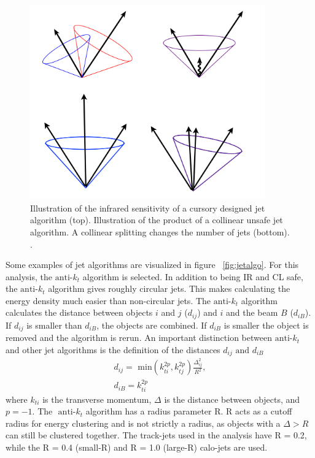 \begin{figure}[h]
\begin{center}
\includegraphics*[width=0.90\textwidth] {figures/IR_CL_safe}
\caption[Illustration of Infrared and collinear safety]{Illustration of the infrared sensitivity of a cursory designed jet algorithm (top). Illustration of the product of a collinear unsafe jet algorithm. A collinear splitting changes the number of jets (bottom). \cite{Isildak:2013kfa}.}
\label{fig:IR_CL}
\end{center}
\end{figure}

\indent Some examples of jet algorithms are visualized in figure ~\ref{fig:jetalgo}. For this analysis, the ${\text{anti-}k_{t}}$ algorithm is selected. In addition to being IR and CL safe, the ${\text{anti-}k_{t}}$ algorithm gives roughly circular jets. This makes calculating the energy density much easier than non-circular jets. The ${\text{anti-}k_{t}}$ algorithm calculates the distance between objects $i$ and $j$ ($d_{ij}$) and $i$ and the beam $B$ ($d_{iB}$). If ${d_{ij}}$ is smaller than ${d_{iB}}$, the objects are combined. If ${d_{iB}}$ is smaller the object is removed and the algorithm is rerun. An important distinction between ${\textrm{anti-}k_{t}}$ and other jet algorithms is the definition of the distances ${d_{ij}\text{ and } d_{iB}}$
\begin{equation}
\begin{split}
d_{ij} = \text{ min}(k^{2p}_{ti},k^{2p}_{tj})\frac{\Delta^{2}_{ij}}{R^{2}},\\
d_{iB} = k^{2p}_{ti}
\end{split}
\end{equation}
where ${k_{ti}}$ is the transverse momentum, ${\Delta}$ is the distance between objects, and ${p=-1}$. The ${\text{ anti-}k_{t}}$ algorithm has a radius parameter R. R acts as a cutoff radius for energy clustering and is not strictly a radius, as objects with a ${\Delta > R}$ can still be clustered together. The track-jets used in the analysis have R = 0.2, while the R = 0.4 (small-R) and R = 1.0 (large-R) calo-jets are used. 
